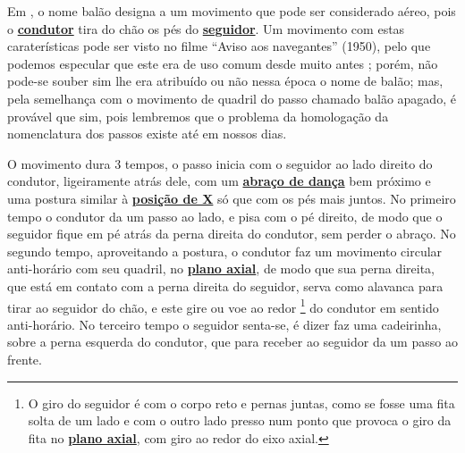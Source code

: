 Em \AnoLivro, o nome balão designa a um movimento que pode ser considerado aéreo, 
pois o \hyperref[def:Condutor]{\textbf{condutor}} tira do chão os pés do \hyperref[def:Seguidor]{\textbf{seguidor}}.
Um movimento com estas caraterísticas pode ser visto no filme ``Aviso aos navegantes'' (1950),
pelo que podemos especular que este era de uso comum desde muito antes \cite[min. 40:35]{AtlantidaDance};
porém, não pode-se souber sim lhe era atribuído ou não nessa época o nome de balão; 
mas, pela semelhança com o movimento de quadril do passo chamado balão apagado,
é provável que sim, 
pois lembremos que o problema da homologação da nomenclatura dos passos existe até em  nossos dias.



O movimento dura 3 tempos, o passo inicia com o seguidor ao lado direito do condutor, 
ligeiramente atrás dele, com um \hyperref[def:abracodedanca]{\textbf{abraço de dança}} 
bem próximo e uma postura similar à \hyperref[def:X-position]{\textbf{posição de X}} só que com os pés mais juntos.
No primeiro tempo o condutor da um passo ao lado, e pisa com o pé direito,
de modo que o seguidor fique em pé atrás da perna direita do condutor, sem perder o abraço.
No segundo tempo, aproveitando a postura, 
o condutor faz um movimento circular anti-horário com seu quadril, no \hyperref[def:PlanoAxial]{\textbf{plano axial}},
de modo que sua perna direita, que está em contato com a perna direita do seguidor,
serva como alavanca para tirar ao seguidor do chão, 
e este gire ou voe ao redor \footnote{O giro do seguidor é com o corpo reto e pernas juntas, 
como se fosse uma fita solta de um lado e com o outro lado presso num ponto 
que provoca o giro da fita no \hyperref[def:PlanoAxial]{\textbf{plano axial}}, com giro ao redor do eixo axial.} 
do condutor em sentido anti-horário.
No terceiro tempo o seguidor senta-se, é dizer faz uma cadeirinha, sobre a perna esquerda do condutor,
que para receber ao seguidor  da um passo ao frente.

